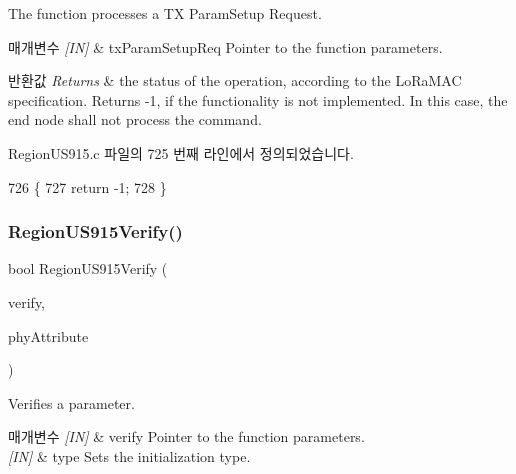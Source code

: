 The function processes a TX Param\+Setup Request. 


\begin{DoxyParams}{매개변수}
{\em \mbox{[}\+I\+N\mbox{]}} & tx\+Param\+Setup\+Req Pointer to the function parameters.\\
\hline
\end{DoxyParams}

\begin{DoxyRetVals}{반환값}
{\em Returns} & the status of the operation, according to the Lo\+Ra\+M\+AC specification. Returns -\/1, if the functionality is not implemented. In this case, the end node shall not process the command. \\
\hline
\end{DoxyRetVals}


Region\+U\+S915.\+c 파일의 725 번째 라인에서 정의되었습니다.


\begin{DoxyCode}
726 \{
727     \textcolor{keywordflow}{return} -1;
728 \}
\end{DoxyCode}
\mbox{\label{group___r_e_g_i_o_n_u_s915_ga2c010d2640341d3e0690d91ac66bc921}} 
\subsubsection{\texorpdfstring{Region\+U\+S915\+Verify()}{RegionUS915Verify()}}
{\footnotesize\ttfamily bool Region\+U\+S915\+Verify (\begin{DoxyParamCaption}\item[{\mbox{\hyperlink{group___r_e_g_i_o_n_ga966d97bc2f25df1c09e92e60ef652276}{Verify\+Params\+\_\+t}} $\ast$}]{verify,  }\item[{\mbox{\hyperlink{group___r_e_g_i_o_n_ga9445b07fdf77581ecfaf389970e635f8}{Phy\+Attribute\+\_\+t}}}]{phy\+Attribute }\end{DoxyParamCaption})}



Verifies a parameter. 


\begin{DoxyParams}{매개변수}
{\em \mbox{[}\+I\+N\mbox{]}} & verify Pointer to the function parameters.\\
\hline
{\em \mbox{[}\+I\+N\mbox{]}} & type Sets the initialization type.\\
\hline
\end{DoxyParams}

